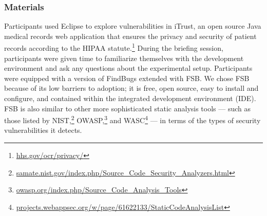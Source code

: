 \documentclass{acm_proc_article-sp}
\begin{document}
\subsubsection{Materials}
Participants used Eclipse to explore vulnerabilities in iTrust, an open source Java medical records web application that ensures the privacy and security of patient records according to the HIPAA statute.\footnote{\url{hhs.gov/ocr/privacy/}} 
During the briefing session, participants were given time to familiarize themselves with the development environment and ask any questions about the experimental setup.
Participants were equipped with a version of FindBugs extended with FSB.
We chose FSB because of its low barriers to adoption; it is free, open source, easy to install and configure, and contained within the integrated development environment (IDE). FSB is also similar to other more sophisticated static analysis tools --- such as those listed by NIST,\footnote{\url{samate.nist.gov/index.php/Source_Code_Security_Analyzers.html}} OWASP,\footnote{\url{owasp.org/index.php/Source_Code_Analysis_Tools}} and WASC\footnote{\url{projects.webappsec.org/w/page/61622133/StaticCodeAnalysisList}} --- in terms of the types of security vulnerabilities it detects.
\end{document}
